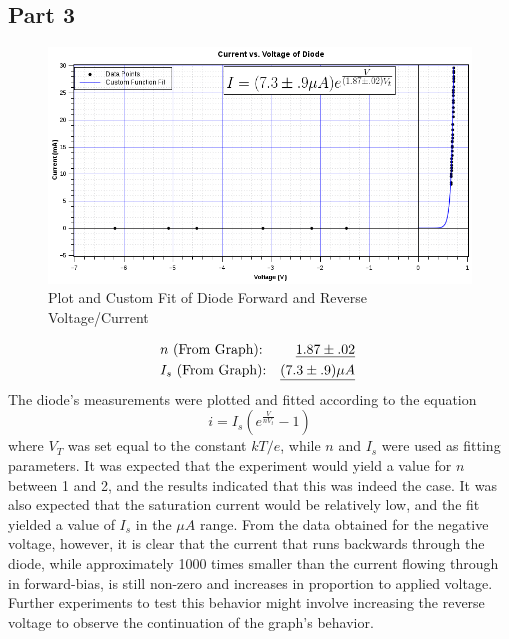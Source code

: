 \documentclass[twocolumn,english]{IEEEtran}
\theoremstyle{plain}
\theoremstyle{plain}
\begin{document}
\noindent\hrulefill
\subsection*{Part 3}
  \begin{figure}[H]
  \begin{centering}
  \begin{center}
  \includegraphics[width=\linewidth]{./Pictures/part3graph.png}
  \caption{Plot and Custom Fit of Diode Forward and Reverse Voltage/Current}
  \label{fig:graph_part3}
  \end{center}
  \par\end{centering}
  \end{figure}
\appendices{}
  \begin{align*}
  &\text{$n$ (From Graph):} 					&\text{\underline{$1.87\pm.02$} } 	\\
  &\text{$I_s$ (From Graph):} 					&\text{\underline{$(7.3 \pm .9) \mu A$} }	\\
  \end{align*}
  The diode's measurements were plotted and fitted according to the equation
  \begin{equation}
   i = I_s\left(e^{\frac{V}{nV_t}}-1\right)
  \end{equation}
  where $V_T$ was set equal to the constant $kT/e$, while $n$ and $I_s$ were used as fitting parameters. It was expected that the experiment would yield a value for $n$ between 1 and 2, and the results indicated that this was indeed the case. It was also expected that the saturation current would be relatively low, and the fit yielded a value of $I_s$ in the $\mu A$ range. From the data obtained for the negative voltage, however, it is clear that the current that runs backwards through the diode, while approximately 1000 times smaller than the current flowing through in forward-bias, is still non-zero and increases in proportion to applied voltage. Further experiments to test this behavior might involve increasing the reverse voltage to observe the continuation of the graph's behavior.


%
%
\end{document}
